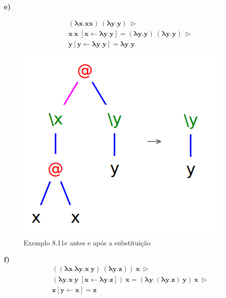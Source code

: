\documentclass[a4paper]{article}
\begin{document}
\FloatBarrier

\textbf{e)}

\begin{align*}
&\mathbf{(\lambda x.x x)\ (\lambda y.y)\ \rhd} \\
&\mathbf{x\ x\ [x \leftarrow \lambda y.y] = (\lambda y.y)\ (\lambda y.y)\ \rhd} \\
&\mathbf{y [y \leftarrow \lambda y.y] = \lambda y.y}
\end{align*}

\begin{figure}[h]
  \centering
  \includegraphics[scale=0.3]{8-11e.png}
  \caption{Exemplo 8.11e antes e após a substituição}
\end{figure}

\FloatBarrier

\textbf{f)}
\begin{align*}
&\mathbf{((\lambda x.\lambda y.x\ y)\ (\lambda y.z))\ x\ \rhd} \\
&\mathbf{(\lambda y.x\ y\ [x \leftarrow \lambda y.z])\ x = (\lambda y.(\lambda y.z)\ y)\ x\ \rhd} \\
&\mathbf{z [y \leftarrow x] = z}
\end{align*}
\end{document}
